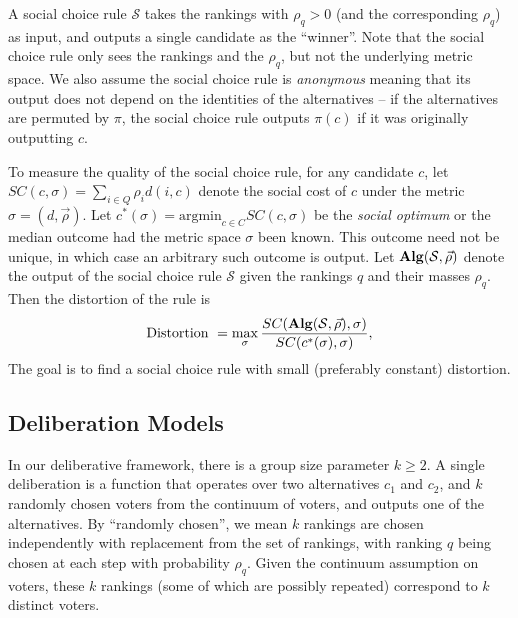 A social choice rule $\mathcal{S}$ takes the rankings with $\rho_q > 0$ (and the corresponding $\rho_q$) as input, and outputs a single candidate as the ``winner''.   Note that the social choice rule only sees the rankings and the $\rho_q$, but not the underlying metric space. %
We also assume the social choice rule is {\em anonymous} meaning that its output does not depend on the identities of the alternatives -- if the alternatives are permuted by $\pi$, the social choice rule outputs $\pi(c)$ if it was originally outputting $c$. 

To measure the quality of the social choice rule, for any candidate $c$, let $SC(c,\sigma) = \sum_{i \in Q} \rho_i d(i,c)$ denote the social cost of $c$ under the metric $\sigma= (d, \vec{\rho})$.   Let $c^*(\sigma) = \mbox{argmin}_{c \in C} SC(c,\sigma)$ be the {\em social optimum} or the median outcome had the metric space $\sigma$ been known. This outcome need not be unique, in which case an arbitrary such outcome is output.  Let $\mathbf{Alg}(\mathcal{S}, \vec{\rho})$ denote the output of the social choice rule $\mathcal{S}$ given the rankings $q$ and their masses $\rho_q$. Then the distortion of the rule is 
$$\mbox{Distortion } = \max_{\sigma } \frac{SC(\mathbf{Alg}(\mathcal{S}, \vec{\rho}),\sigma)}{SC(c^*(\sigma),\sigma)},$$ 
The goal is to find a social choice rule with small (preferably constant) distortion.

\subsection{Deliberation Models} 
In our deliberative framework, there is a group size parameter $k \ge 2$. A single deliberation is a function that operates over two alternatives $c_1$ and $c_2$, and $k$ randomly chosen voters from the continuum of voters, and outputs one of the alternatives. By ``randomly chosen'', we mean $k$ rankings are chosen independently with replacement from the set of rankings, with ranking $q$ being chosen at each step with probability $\rho_q$. Given the continuum assumption on voters, these $k$ rankings (some of which are possibly repeated) correspond to $k$ distinct voters.

